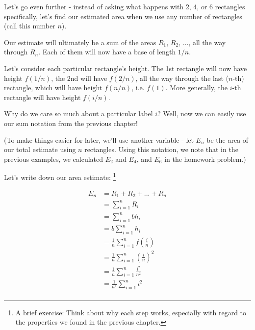 \documentclass{book}
\begin{document}
Let's go even further - instead of asking what happens with 2, 4, or 6 rectangles specifically, let's find our estimated area when we use any number of rectangles (call this number $n$). 

Our estimate will ultimately be a sum of the areas $R_1$, $R_2$, ..., all the way through $R_n$. Each of them will now have a base of length $1/n$. 

Let's consider each particular rectangle's height. The 1st rectangle will now have height $f(1/n)$, the 2nd will have $f(2/n)$, all the way through the last ($n$-th) rectangle, which will have height $f(n/n)$, i.e. $f(1)$. More generally, the $i$-th rectangle will have height $f(i/n)$. 



Why do we care so much about a particular label $i$? Well, now we can easily use our sum notation from the previous chapter! 

(To make things easier for later, we'll use another variable - let $E_n$ be the area of our total estimate using $n$ rectangles. Using this notation, we note that in the previous examples, we calculated $E_2$ and $E_4$, and $E_6$ in the homework problem.)

Let's write down our area estimate: \footnote{A brief exercise: Think about why each step works, especially with regard to the properties we found in the previous chapter.}


\begin{align*}
E_n &= R_1 + R_2 + ... + R_n \\
&= \sum_{i=1}^n R_i \\
&= \sum_{i=1}^n b h_i \\
&= b \sum_{i=1}^n h_i \\
&= \frac{1}{n} \sum_{i=1}^n f(\frac{i}{n}) \\
&= \frac{1}{n} \sum_{i=1}^n \left(\frac{i}{n}\right)^2 \\
&= \frac{1}{n} \sum_{i=1}^n \frac{i^2}{n^2} \\
&= \frac{1}{n^3} \sum_{i=1}^n i^2 \\
\end{align*}
\end{document}

